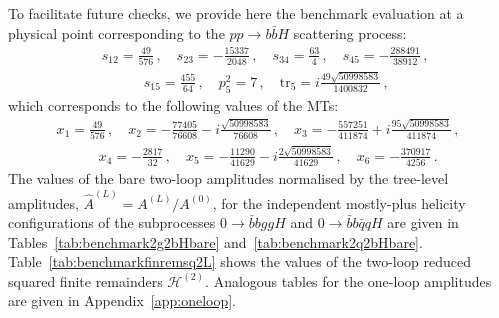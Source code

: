 \documentclass[main.tex]{subfiles}
\begin{document}
To facilitate future checks, we provide here the benchmark evaluation at a physical point corresponding to the $pp \to b\bar{b}H$ scattering process:
\begin{align}
&s_{12}=\frac{49}{576}\,, \quad 
s_{23}=-\frac{15337}{2048}\,, \quad 
s_{34} = \frac{63}{4}\,,\quad  
s_{45} = -\frac{288491}{38912}\,,\nonumber \\[10pt]
& \qquad \quad s_{15} = \frac{455}{64}\,, \quad 
p_5^2 = 7\,, \quad 
\mathrm{tr}_5 = i\frac{49\sqrt{50998583}}{1400832}  \,,
\label{eq:physicalpointHbb}
\end{align}
which corresponds to the following values of the MTs:
\begin{align}
&
x_{1}=\frac{49}{576}\,, \quad 
x_{2}=-\frac{77405}{76608}-i\frac{\sqrt{50998583}}{76608}\,, \quad
x_{3}=-\frac{557251}{411874}+i\frac{95\sqrt{50998583}}{411874}\,, \quad \nonumber \\[10pt]
& \qquad \quad
x_{4}=-\frac{2817}{32}\,,\quad 
x_{5}=-\frac{11290}{41629} - i\frac{2\sqrt{50998583}}{41629}\,, \quad 
x_{6}=-\frac{370917}{4256} \,.
\label{eq:physicalpointHbbMomTwistor}
\end{align}
The values of the bare two-loop amplitudes normalised by the tree-level amplitudes,
$\hat{A}^{(L)} = A^{(L)}/A^{(0)}$,
for the independent mostly-plus helicity configurations of the subprocesses $0\to \bar{b} b gg H$ and $0\to \bar{b} b \bar{q} q H$ are given in Tables~\ref{tab:benchmark2g2bHbare} and~\ref{tab:benchmark2q2bHbare}. Table~\ref{tab:benchmarkfinremsq2L} shows the values of the two-loop reduced squared finite remainders $\mathcal{H}^{(2)}$. 
Analogous tables for the one-loop amplitudes are given in Appendix~\ref{app:oneloop}.
\end{document}
